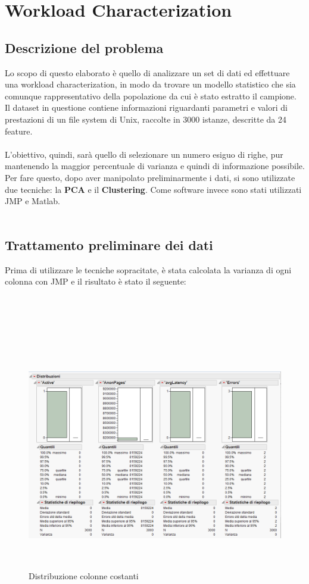 \chapter{Workload Characterization}

\section{Descrizione del problema}
Lo scopo di questo elaborato è quello di analizzare un set di dati ed effettuare una workload characterization, in modo da trovare un modello statistico che sia comunque rappresentativo della popolazione da cui è stato estratto il campione.\\
Il dataset in questione contiene informazioni riguardanti parametri e valori di prestazioni di un file system di Unix, raccolte in 3000 istanze, descritte da 24 feature.\\\\
L'obiettivo, quindi, sarà quello di selezionare un numero esiguo di righe, pur mantenendo la maggior percentuale di varianza e quindi di informazione possibile.\\
Per fare questo, dopo aver manipolato preliminarmente i dati, si sono utilizzate due tecniche: la \textbf{PCA} e il \textbf{Clustering}. Come software invece sono stati utilizzati JMP e Matlab.\\\\

\section{Trattamento preliminare dei dati}
Prima di utilizzare le tecniche sopracitate, è stata calcolata la varianza di ogni colonna con JMP e il risultato è stato il seguente:\\\\\\\\\\

\begin{figure}[!h]
	\centering
	\includegraphics[width=15cm, height=10cm]{./immagine/colonne_costanti.png}
	\caption{Distribuzione colonne costanti}
	\label{fig:colonne_costanti}
\end{figure}

